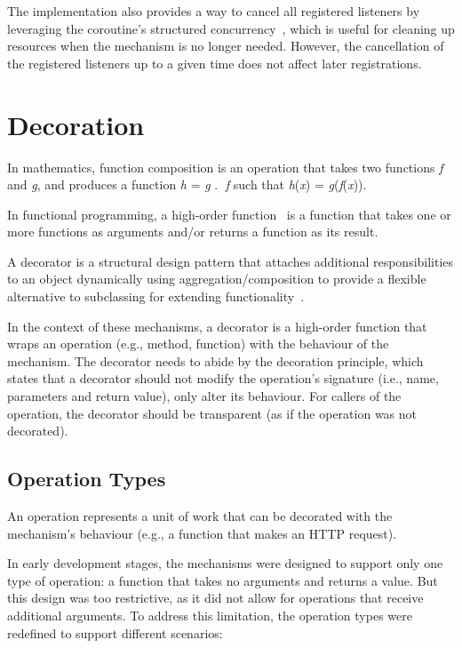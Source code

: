 The implementation also provides a way to cancel all registered listeners by leveraging the coroutine's structured concurrency~\cite{kotlin-coroutines}, which is useful for cleaning up resources when the mechanism is no longer needed.
However, the cancellation of the registered listeners up to a given time does not affect later registrations.


\section{Decoration}\label{sec:decoration}

In mathematics,
function composition is an operation that takes two functions \textit{f} and \textit{g}, and produces a function \textit{h} = \textit{g} \textcircled{.} \textit{f} such that \textit{h}(\textit{x}) = \textit{g}(\textit{f}(\textit{x})).

In functional programming, a high-order function~\cite{higher-order-functions} is a function
that takes one or more functions as arguments and/or returns a function as its result.

A decorator is a structural design pattern
that attaches additional responsibilities to an object dynamically using aggregation/composition to provide a flexible alternative to subclassing for extending functionality~\cite{design-patterns}.

In the context of these mechanisms,
a decorator is a high-order function that wraps an operation
(e.g., method, function) with the behaviour of the mechanism.
The decorator needs to abide by the decoration principle,
which states that a decorator should not modify the operation's signature (i.e., name, parameters and return value), only alter its behaviour.
For callers of the operation, the decorator should be transparent (as if the operation was not decorated).

\subsection{Operation Types}\label{subsec:operation-types}

An operation represents a unit of work that can be decorated with the mechanism's behaviour (e.g., a function that makes an HTTP request).

In early development stages, the mechanisms were designed to support only one type of operation:
a function that takes no arguments and returns a value.
But this design was too restrictive, as it did not allow for operations that receive additional arguments.
To address this limitation, the operation types were redefined to support different scenarios:

